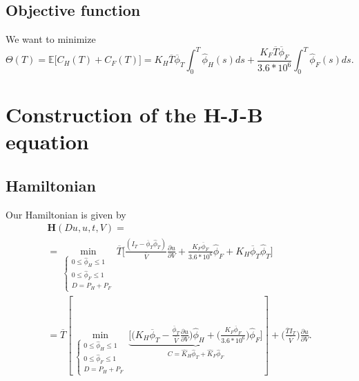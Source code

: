 \documentclass[12pt]{article}
\theoremstyle{definition}
\theoremstyle{remark}
\newcommand{\E}{\mathbb{E}}
\begin{document}
\subsection{Objective function}

We want to minimize
\begin{equation*}
\Theta(T)=\E\Big[C_H(T)+C_F(T)\Big]=K_H\overline{T}\overline{\phi}_T\int_0^T\hat{\phi}_H(s)ds+\frac{K_F\overline{T}\overline{\phi}_F}{3.6*10^6}\int_0^T\hat{\phi}_F(s)ds.
\end{equation*}

\section{Construction of the H-J-B equation}

\subsection{Hamiltonian}

Our Hamiltonian is given by
\begin{multline*}
\mathbf{H}(Du,u,t,V)=\\
=\min_{\begin{cases}
0\leq\hat{\phi}_H\leq1\\
0\leq\hat{\phi}_F\leq1\\
D=P_H+P_F
\end{cases}}\overline{T}\Bigg[\frac{(I_T-\overline{\phi}_T\hat{\phi}_T)}{\overline{V}}\frac{\partial u}{\partial V}+\frac{K_F\overline{\phi}_F}{3.6*10^6}\hat{\phi}_F+K_H\overline{\phi}_T\hat{\phi}_T\Bigg]\\
=\overline{T}\left[\min_{\begin{cases}
0\leq\hat{\phi}_H\leq1\\
0\leq\hat{\phi}_F\leq1\\
D=P_H+P_F
\end{cases}}\underbrace{\Bigg[\Bigg(K_H\overline{\phi}_T-\frac{\overline{\phi}_T}{\overline{V}}\frac{\partial u}{\partial V}\Bigg)\hat{\phi}_H+\Bigg(\frac{K_F\overline{\phi}_F}{3.6*10^6}\Bigg)\hat{\phi}_F\Bigg]}_{C=\hat{K}_H\hat{\phi}_T+\hat{K}_F\hat{\phi}_F}\right]+\Bigg(\frac{\overline{T}I_T}{\overline{V}}\Bigg)\frac{\partial u}{\partial V}.
\end{multline*}
\end{document}
